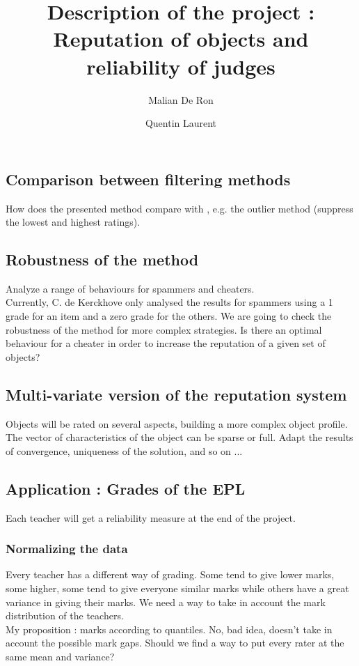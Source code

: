 \documentclass[12pt,a4paper,notitlepage]{article}
\title{Description of the project : Reputation of objects and reliability of judges}
\author{Malian De Ron \and Quentin Laurent}
\begin{document}
\maketitle
\subsection*{Comparison between filtering methods}
How does the presented method compare with , e.g. the outlier method (suppress the lowest and highest ratings).
\subsection*{Robustness of the method}
Analyze a range of behaviours for spammers and cheaters.\\
Currently, C. de Kerckhove only analysed the results for spammers using a 1 grade for an item and a zero grade for the others. We are going to check the robustness of the method for more complex strategies. Is there an optimal behaviour for a cheater in order to increase the reputation of a given set of objects?
\subsection*{Multi-variate version of the reputation system}
Objects will be rated on several aspects, building a more complex object profile. The vector of characteristics of the object can be sparse or full.
Adapt the results of convergence, uniqueness of the solution, and so on ...
\subsection*{Application : Grades of the EPL}
Each teacher will get a reliability measure at the end of the project.
\subsubsection*{Normalizing the data}
Every teacher has a different way of grading. Some tend to give lower marks, some higher, some tend to give everyone similar marks while others have a great variance in giving their marks. We need a way to take in account the mark distribution of the teachers.\\
My proposition : marks according to quantiles. No, bad idea, doesn't take in account the possible mark gaps. Should we find a way to put every rater at the same mean and variance?
\end{document}

